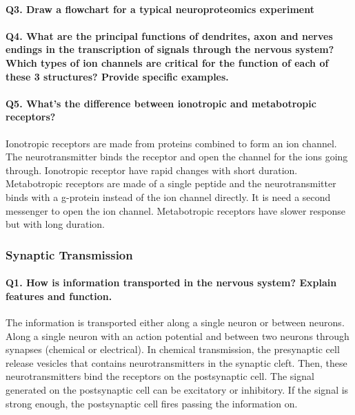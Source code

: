 \documentclass[12pt,article,oneside,a4paper]{memoir}
\begin{document}
\paragraph{Q3. Draw a flowchart for a typical neuroproteomics experiment}

\paragraph{Q4. What are the principal functions of dendrites, axon and nerves endings in the transcription of signals through the nervous system? Which types of ion channels are critical for the function of each of these 3 structures? Provide specific examples.}

\paragraph{Q5. What’s the difference between ionotropic and metabotropic receptors?} Ionotropic receptors are made from proteins combined to form an ion channel. The neurotransmitter binds the receptor and open the channel for the ions going through. Ionotropic receptor have rapid changes with short duration. Metabotropic receptors are made of a single peptide and the neurotransmitter binds with a g-protein instead of the ion channel directly. It is need a second messenger to open the ion channel. Metabotropic receptors have slower response but with long duration.


\subsubsection{Synaptic Transmission}
\paragraph{Q1. How is information transported in the nervous system? Explain features and function.}
The information is transported either along a single neuron or between neurons. Along a single neuron with an action potential and between two neurons through synapses (chemical or electrical).
In chemical transmission, the presynaptic cell release vesicles that contains neurotransmitters in the synaptic cleft. Then, these neurotransmitters bind the receptors on the postsynaptic cell. The signal generated on the postsynaptic cell can be excitatory or inhibitory. If the signal is strong enough, the postsynaptic cell fires passing the information on.
\end{document}
